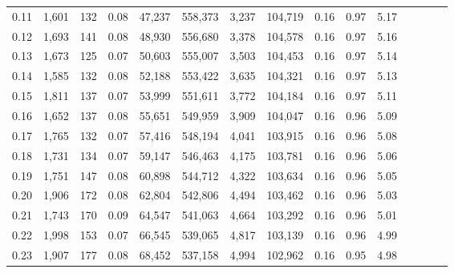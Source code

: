 \begin{tabular}{rrrcrrrrrrrrrrr}
0.11 &   1,601 &    132 &                                       0.08 &   47,237 &  558,373 &    3,237 &  104,719 &  0.16 &  0.97 &                         5.17 \\
0.12 &   1,693 &    141 &                                       0.08 &   48,930 &  556,680 &    3,378 &  104,578 &  0.16 &  0.97 &                         5.16 \\
0.13 &   1,673 &    125 &                                       0.07 &   50,603 &  555,007 &    3,503 &  104,453 &  0.16 &  0.97 &                         5.14 \\
0.14 &   1,585 &    132 &                                       0.08 &   52,188 &  553,422 &    3,635 &  104,321 &  0.16 &  0.97 &                         5.13 \\
0.15 &   1,811 &    137 &                                       0.07 &   53,999 &  551,611 &    3,772 &  104,184 &  0.16 &  0.97 &                         5.11 \\
0.16 &   1,652 &    137 &                                       0.08 &   55,651 &  549,959 &    3,909 &  104,047 &  0.16 &  0.96 &                         5.09 \\
0.17 &   1,765 &    132 &                                       0.07 &   57,416 &  548,194 &    4,041 &  103,915 &  0.16 &  0.96 &                         5.08 \\
0.18 &   1,731 &    134 &                                       0.07 &   59,147 &  546,463 &    4,175 &  103,781 &  0.16 &  0.96 &                         5.06 \\
0.19 &   1,751 &    147 &                                       0.08 &   60,898 &  544,712 &    4,322 &  103,634 &  0.16 &  0.96 &                         5.05 \\
0.20 &   1,906 &    172 &                                       0.08 &   62,804 &  542,806 &    4,494 &  103,462 &  0.16 &  0.96 &                         5.03 \\
0.21 &   1,743 &    170 &                                       0.09 &   64,547 &  541,063 &    4,664 &  103,292 &  0.16 &  0.96 &                         5.01 \\
0.22 &   1,998 &    153 &                                       0.07 &   66,545 &  539,065 &    4,817 &  103,139 &  0.16 &  0.96 &                         4.99 \\
0.23 &   1,907 &    177 &                                       0.08 &   68,452 &  537,158 &    4,994 &  102,962 &  0.16 &  0.95 &                         4.98 \\

\end{tabular}
